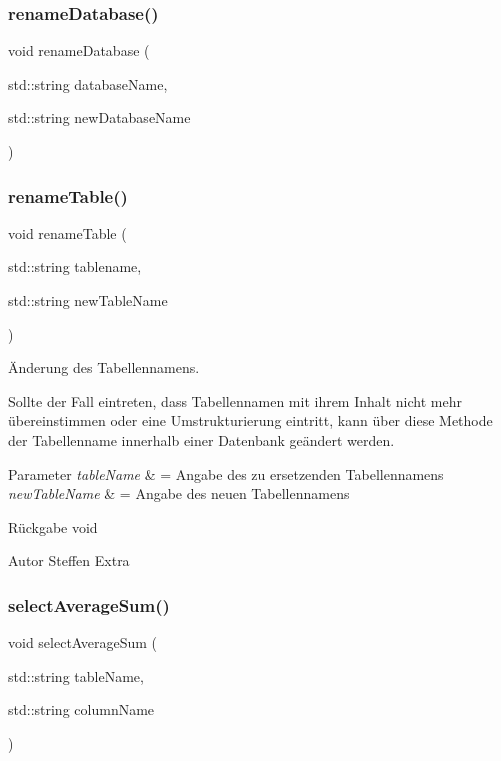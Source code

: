 \subsubsection{rename\+Database()}
{\footnotesize\ttfamily void rename\+Database (\begin{DoxyParamCaption}\item[{std\+::string}]{database\+Name,  }\item[{std\+::string}]{new\+Database\+Name }\end{DoxyParamCaption})}

\mbox{\label{sqllib_8hpp_a526b049a888b2a4a1332a10540689afd}} 
\subsubsection{rename\+Table()}
{\footnotesize\ttfamily void rename\+Table (\begin{DoxyParamCaption}\item[{std\+::string}]{tablename,  }\item[{std\+::string}]{new\+Table\+Name }\end{DoxyParamCaption})}



Änderung des Tabellennamens. 

Sollte der Fall eintreten, dass Tabellennamen mit ihrem Inhalt nicht mehr übereinstimmen oder eine Umstrukturierung eintritt, kann über diese Methode der Tabellenname innerhalb einer Datenbank geändert werden.


\begin{DoxyParams}{Parameter}
{\em table\+Name} & = Angabe des zu ersetzenden Tabellennamens \\
\hline
{\em new\+Table\+Name} & = Angabe des neuen Tabellennamens\\
\hline
\end{DoxyParams}
\begin{DoxyReturn}{Rückgabe}
void
\end{DoxyReturn}
\begin{DoxyAuthor}{Autor}
Steffen Extra 
\end{DoxyAuthor}
\mbox{\label{sqllib_8hpp_a01bd0062142a17ad04b7101bac7b38b6}} 
\subsubsection{select\+Average\+Sum()}
{\footnotesize\ttfamily void select\+Average\+Sum (\begin{DoxyParamCaption}\item[{std\+::string}]{table\+Name,  }\item[{std\+::string}]{column\+Name }\end{DoxyParamCaption})}

